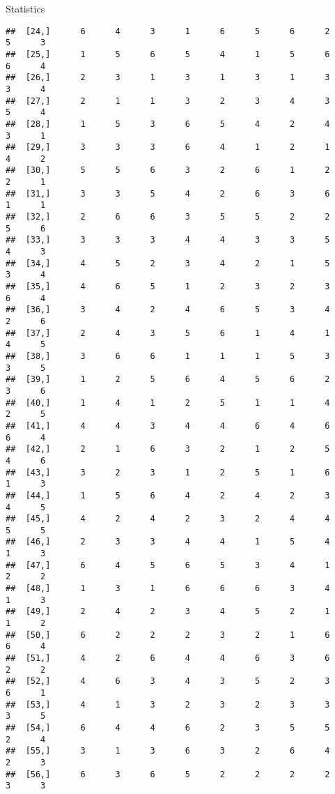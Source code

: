 \documentclass[
  ignorenonframetext,
]{beamer}
\begin{document}
\begin{frame}[fragile]{Statistics}
\begin{verbatim}
##  [24,]      6      4      3      1      6      5      6      2      5      3
##  [25,]      1      5      6      5      4      1      5      6      6      4
##  [26,]      2      3      1      3      1      3      1      3      3      4
##  [27,]      2      1      1      3      2      3      4      3      5      4
##  [28,]      1      5      3      6      5      4      2      4      3      1
##  [29,]      3      3      3      6      4      1      2      1      4      2
##  [30,]      5      5      6      3      2      6      1      2      2      1
##  [31,]      3      3      5      4      2      6      3      6      1      1
##  [32,]      2      6      6      3      5      5      2      2      5      6
##  [33,]      3      3      3      4      4      3      3      5      4      3
##  [34,]      4      5      2      3      4      2      1      5      3      4
##  [35,]      4      6      5      1      2      3      2      3      6      4
##  [36,]      3      4      2      4      6      5      3      4      2      6
##  [37,]      2      4      3      5      6      1      4      1      4      5
##  [38,]      3      6      6      1      1      1      5      3      3      5
##  [39,]      1      2      5      6      4      5      6      2      3      6
##  [40,]      1      4      1      2      5      1      1      4      2      5
##  [41,]      4      4      3      4      4      6      4      6      6      4
##  [42,]      2      1      6      3      2      1      2      5      4      6
##  [43,]      3      2      3      1      2      5      1      6      1      3
##  [44,]      1      5      6      4      2      4      2      3      4      5
##  [45,]      4      2      4      2      3      2      4      4      5      5
##  [46,]      2      3      3      4      4      1      5      4      1      3
##  [47,]      6      4      5      6      5      3      4      1      2      2
##  [48,]      1      3      1      6      6      6      3      4      1      3
##  [49,]      2      4      2      3      4      5      2      1      1      2
##  [50,]      6      2      2      2      3      2      1      6      6      4
##  [51,]      4      2      6      4      4      6      3      6      2      2
##  [52,]      4      6      3      4      3      5      2      3      6      1
##  [53,]      4      1      3      2      3      2      3      3      3      5
##  [54,]      6      4      4      6      2      3      5      5      2      4
##  [55,]      3      1      3      6      3      2      6      4      2      3
##  [56,]      6      3      6      5      2      2      2      2      3      3

\end{verbatim}
\end{frame}
\end{document}
